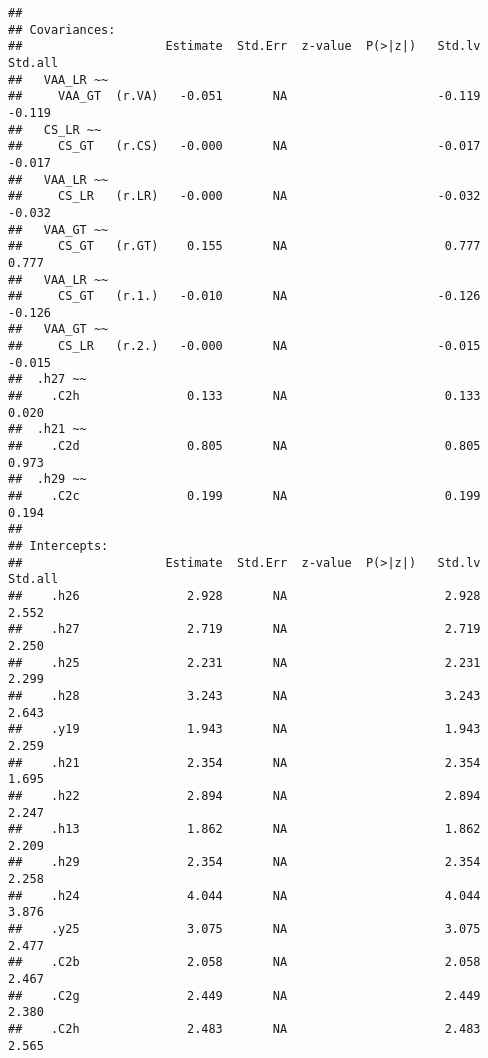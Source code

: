 \documentclass[
]{article}
\begin{document}
\begin{verbatim}
## 
## Covariances:
##                    Estimate  Std.Err  z-value  P(>|z|)   Std.lv  Std.all
##   VAA_LR ~~                                                             
##     VAA_GT  (r.VA)   -0.051       NA                     -0.119   -0.119
##   CS_LR ~~                                                              
##     CS_GT   (r.CS)   -0.000       NA                     -0.017   -0.017
##   VAA_LR ~~                                                             
##     CS_LR   (r.LR)   -0.000       NA                     -0.032   -0.032
##   VAA_GT ~~                                                             
##     CS_GT   (r.GT)    0.155       NA                      0.777    0.777
##   VAA_LR ~~                                                             
##     CS_GT   (r.1.)   -0.010       NA                     -0.126   -0.126
##   VAA_GT ~~                                                             
##     CS_LR   (r.2.)   -0.000       NA                     -0.015   -0.015
##  .h27 ~~                                                                
##    .C2h               0.133       NA                      0.133    0.020
##  .h21 ~~                                                                
##    .C2d               0.805       NA                      0.805    0.973
##  .h29 ~~                                                                
##    .C2c               0.199       NA                      0.199    0.194
## 
## Intercepts:
##                    Estimate  Std.Err  z-value  P(>|z|)   Std.lv  Std.all
##    .h26               2.928       NA                      2.928    2.552
##    .h27               2.719       NA                      2.719    2.250
##    .h25               2.231       NA                      2.231    2.299
##    .h28               3.243       NA                      3.243    2.643
##    .y19               1.943       NA                      1.943    2.259
##    .h21               2.354       NA                      2.354    1.695
##    .h22               2.894       NA                      2.894    2.247
##    .h13               1.862       NA                      1.862    2.209
##    .h29               2.354       NA                      2.354    2.258
##    .h24               4.044       NA                      4.044    3.876
##    .y25               3.075       NA                      3.075    2.477
##    .C2b               2.058       NA                      2.058    2.467
##    .C2g               2.449       NA                      2.449    2.380
##    .C2h               2.483       NA                      2.483    2.565

\end{verbatim}
\end{document}

